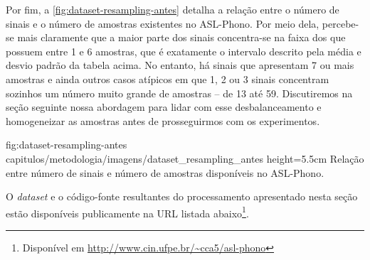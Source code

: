 Por fim, a \autoref{fig:dataset-resampling-antes} detalha a relação entre o número de sinais e o número de amostras existentes no ASL-Phono. Por meio dela, percebe-se mais claramente que a maior parte dos sinais concentra-se na faixa dos que possuem entre 1 e 6 amostras, que é exatamente o intervalo descrito pela média e desvio padrão da tabela acima.
No entanto, há sinais que apresentam 7 ou mais amostras e ainda outros casos atípicos em que 1, 2 ou 3 sinais concentram sozinhos um número muito grande de amostras -- de 13 até 59.
Discutiremos na seção seguinte nossa abordagem para lidar com esse desbalanceamento e homogeneizar as amostras antes de prosseguirmos com os experimentos.

\figura
{fig:dataset-resampling-antes} %
{capitulos/metodologia/imagens/dataset_resampling_antes} %
{height=5.5cm} %
{Relação entre número de sinais e número de amostras disponíveis no ASL-Phono.} %
{} %


O \textit{dataset} e o código-fonte resultantes do processamento apresentado nesta seção estão disponíveis publicamente na URL listada abaixo\footnote{Disponível em \url{http://www.cin.ufpe.br/~cca5/asl-phono}}.
